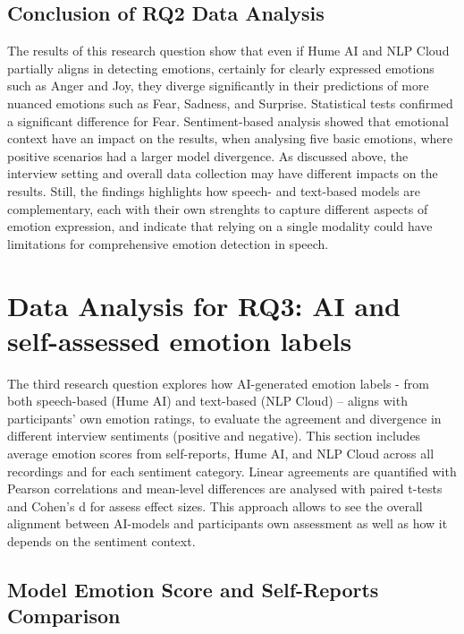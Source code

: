 \subsection{Conclusion of RQ2 Data Analysis}
The results of this research question show that even if Hume AI and NLP Cloud partially aligns in detecting emotions, certainly for clearly expressed emotions such as Anger and Joy, 
they diverge significantly in their predictions of more nuanced emotions such as Fear, Sadness, and Surprise. Statistical tests confirmed a significant difference for Fear. 
Sentiment-based analysis showed that emotional context have an impact on the results, when analysing five basic emotions, where positive scenarios had a larger model divergence. 
As discussed above, the interview setting and overall data collection may have different impacts on the results. Still, the findings highlights how speech- and text-based models are complementary, each 
with their own strenghts to capture different aspects of emotion expression, and indicate that relying on a single modality could have limitations for comprehensive emotion detection in speech.  


\section{Data Analysis for RQ3: AI and self-assessed emotion labels}

The third research question explores how AI-generated emotion labels - from both speech-based (Hume AI) and text-based (NLP Cloud) – aligns with participants’ own emotion ratings, to evaluate the agreement and divergence in different interview sentiments (positive and negative). This section includes average emotion scores from self-reports, Hume AI, and NLP Cloud across all recordings and for each sentiment category. Linear agreements are quantified with Pearson correlations and mean-level differences are analysed with paired t-tests and Cohen’s d for assess effect sizes. This approach allows to see the overall alignment between AI-models and participants own assessment as well as how it depends on the sentiment context. 
\subsection{Model Emotion Score and Self-Reports Comparison}

